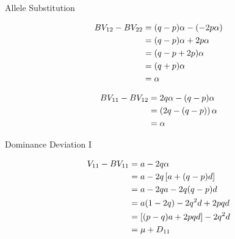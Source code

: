 \documentclass[ignorenonframetext,]{beamer}
\begin{document}

\begin{frame}{Allele Substitution}
\protect\hypertarget{allele-substitution}{}

\begin{align}
    BV_{12} - BV_{22} &=   (q-p)\alpha - \left( -2p\alpha \right)  \notag \\
                      &=   (q-p)\alpha + 2p\alpha \notag \\
                      &=   (q-p+2p)\alpha \notag \\
                      &=   (q+p)\alpha \notag \\
                      &=   \alpha \notag
\end{align}

\begin{align}
    BV_{11} - BV_{12} &=   2q\alpha - (q-p)\alpha \nonumber \\
                      &=   \left(2q - (q-p)\right)\alpha \nonumber\\
                      &=   \alpha \notag
\end{align}

\end{frame}

\begin{frame}{Dominance Deviation I}
\protect\hypertarget{dominance-deviation-i}{}

\begin{align}
  V_{11} - BV_{11} &=   a - 2q \alpha \notag \\
                   &=   a - 2q \left[ a + (q-p)d \right] \notag \\
                   &=   a - 2qa -2q(q-p)d \notag \\
                   &=   a(1-2q) - 2q^2d + 2pqd \notag \\
                   &=   \left[(p - q)a + 2pqd\right] - 2q^2d \notag \\
                   &=   \mu + D_{11} \notag
  \end{align}

\end{frame}
\end{document}
